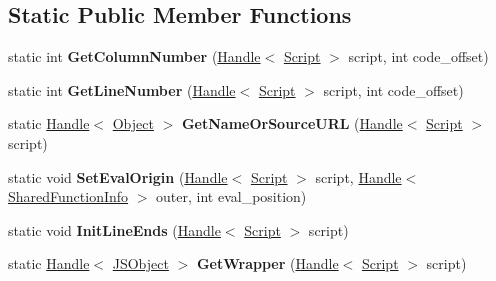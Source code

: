 \subsection*{Static Public Member Functions}
\begin{DoxyCompactItemize}
\item 
static int {\bfseries Get\+Column\+Number} (\hyperlink{classv8_1_1internal_1_1_handle}{Handle}$<$ \hyperlink{classv8_1_1internal_1_1_script}{Script} $>$ script, int code\+\_\+offset)\hypertarget{classv8_1_1internal_1_1_script_a10d1a2d6ae54fd05c404861229b6e674}{}\label{classv8_1_1internal_1_1_script_a10d1a2d6ae54fd05c404861229b6e674}

\item 
static int {\bfseries Get\+Line\+Number} (\hyperlink{classv8_1_1internal_1_1_handle}{Handle}$<$ \hyperlink{classv8_1_1internal_1_1_script}{Script} $>$ script, int code\+\_\+offset)\hypertarget{classv8_1_1internal_1_1_script_a362a2b70d823f4a69bc557113850a2c1}{}\label{classv8_1_1internal_1_1_script_a362a2b70d823f4a69bc557113850a2c1}

\item 
static \hyperlink{classv8_1_1internal_1_1_handle}{Handle}$<$ \hyperlink{classv8_1_1internal_1_1_object}{Object} $>$ {\bfseries Get\+Name\+Or\+Source\+U\+RL} (\hyperlink{classv8_1_1internal_1_1_handle}{Handle}$<$ \hyperlink{classv8_1_1internal_1_1_script}{Script} $>$ script)\hypertarget{classv8_1_1internal_1_1_script_a396ee21c2637f6099a50d104adaa709d}{}\label{classv8_1_1internal_1_1_script_a396ee21c2637f6099a50d104adaa709d}

\item 
static void {\bfseries Set\+Eval\+Origin} (\hyperlink{classv8_1_1internal_1_1_handle}{Handle}$<$ \hyperlink{classv8_1_1internal_1_1_script}{Script} $>$ script, \hyperlink{classv8_1_1internal_1_1_handle}{Handle}$<$ \hyperlink{classv8_1_1internal_1_1_shared_function_info}{Shared\+Function\+Info} $>$ outer, int eval\+\_\+position)\hypertarget{classv8_1_1internal_1_1_script_a812ae858c5de9ff336397c6beee187ed}{}\label{classv8_1_1internal_1_1_script_a812ae858c5de9ff336397c6beee187ed}

\item 
static void {\bfseries Init\+Line\+Ends} (\hyperlink{classv8_1_1internal_1_1_handle}{Handle}$<$ \hyperlink{classv8_1_1internal_1_1_script}{Script} $>$ script)\hypertarget{classv8_1_1internal_1_1_script_ab34230113920d04f77c2a884c47a9506}{}\label{classv8_1_1internal_1_1_script_ab34230113920d04f77c2a884c47a9506}

\item 
static \hyperlink{classv8_1_1internal_1_1_handle}{Handle}$<$ \hyperlink{classv8_1_1internal_1_1_j_s_object}{J\+S\+Object} $>$ {\bfseries Get\+Wrapper} (\hyperlink{classv8_1_1internal_1_1_handle}{Handle}$<$ \hyperlink{classv8_1_1internal_1_1_script}{Script} $>$ script)\hypertarget{classv8_1_1internal_1_1_script_abf57cb5e70fa77906c644efa9a3ea1d5}{}\label{classv8_1_1internal_1_1_script_abf57cb5e70fa77906c644efa9a3ea1d5}

\end{DoxyCompactItemize}
